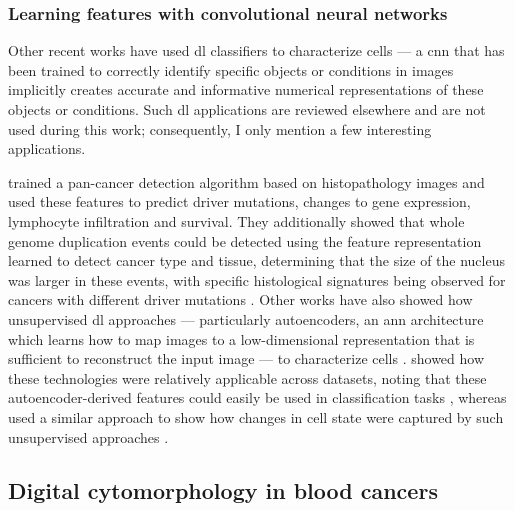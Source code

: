 \subsubsection{Learning features with convolutional neural networks}

Other recent works have used \ac{dl} classifiers to characterize cells --- a \ac{cnn} that has been trained to correctly identify specific objects or conditions in images implicitly creates accurate and informative numerical representations of these objects or conditions. Such \ac{dl} applications are reviewed elsewhere \cite{Moen2019-py,Pratapa2021-ee} and are not used during this work; consequently, I only mention a few interesting applications. 

 trained a pan-cancer detection algorithm based on histopathology images and used these features to predict driver mutations, changes to gene expression, lymphocyte infiltration and survival. They additionally showed that whole genome duplication events could be detected using the feature representation learned to detect cancer type and tissue, determining that the size of the nucleus was larger in these events, with specific histological signatures being observed for cancers with different driver mutations \cite{Fu2020-mx}. Other works have also showed how unsupervised \ac{dl} approaches --- particularly autoencoders, an \ac{ann} architecture which learns how to map images to a low-dimensional representation that is sufficient to reconstruct the input image --- to characterize cells \cite{Sommer2017-uj,Wei2021-gw}.  showed how these technologies were relatively applicable across datasets, noting that these autoencoder-derived features could easily be used in classification tasks \cite{Wei2021-gw}, whereas  used a similar approach to show how changes in cell state were captured by such unsupervised approaches \cite{Sommer2017-uj}.

\subsection{Digital cytomorphology in blood cancers}

